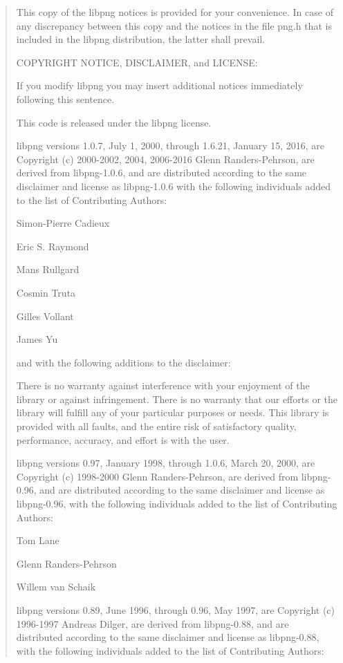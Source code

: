 \documentclass[
]{book}
\theoremstyle{definition}
\theoremstyle{definition}
\theoremstyle{definition}
\theoremstyle{definition}
\theoremstyle{remark}
\begin{document}
\begin{quote}
This copy of the libpng notices is provided for your convenience. In case of
any discrepancy between this copy and the notices in the file png.h that is
included in the libpng distribution, the latter shall prevail.

COPYRIGHT NOTICE, DISCLAIMER, and LICENSE:

If you modify libpng you may insert additional notices immediately following
this sentence.

This code is released under the libpng license.

libpng versions 1.0.7, July 1, 2000, through 1.6.21, January 15, 2016, are
Copyright (c) 2000-2002, 2004, 2006-2016 Glenn Randers-Pehrson, are
derived from libpng-1.0.6, and are distributed according to the same
disclaimer and license as libpng-1.0.6 with the following individuals
added to the list of Contributing Authors:

Simon-Pierre Cadieux

Eric S. Raymond

Mans Rullgard

Cosmin Truta

Gilles Vollant

James Yu

and with the following additions to the disclaimer:

There is no warranty against interference with your enjoyment of the
library or against infringement. There is no warranty that our
efforts or the library will fulfill any of your particular purposes
or needs. This library is provided with all faults, and the entire
risk of satisfactory quality, performance, accuracy, and effort is with
the user.

libpng versions 0.97, January 1998, through 1.0.6, March 20, 2000, are
Copyright (c) 1998-2000 Glenn Randers-Pehrson, are derived from
libpng-0.96, and are distributed according to the same disclaimer and
license as libpng-0.96, with the following individuals added to the list
of Contributing Authors:

Tom Lane

Glenn Randers-Pehrson

Willem van Schaik

libpng versions 0.89, June 1996, through 0.96, May 1997, are
Copyright (c) 1996-1997 Andreas Dilger, are derived from libpng-0.88,
and are distributed according to the same disclaimer and license as
libpng-0.88, with the following individuals added to the list of
Contributing Authors:


\end{quote}
\end{document}

